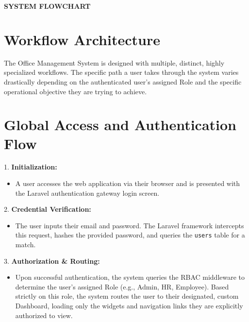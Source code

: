 ﻿\documentclass[12pt,a4paper]{report}
\begin{document}
\newpage
\vspace*{\fill}
\begin{center}
{\LARGE \textbf{SYSTEM FLOWCHART}}
\end{center}
\vspace*{\fill}

\newpage
\section*{Workflow Architecture}
The Office Management System is designed with multiple, distinct, highly specialized workflows. The specific path a user takes through the system varies drastically depending on the authenticated user's assigned Role and the specific operational objective they are trying to achieve.

\section*{Global Access and Authentication Flow}
1. \textbf{Initialization:}
    \begin{itemize}
        \item A user accesses the web application via their browser and is presented with the Laravel authentication gateway login screen.
    \end{itemize}
2. \textbf{Credential Verification:}
    \begin{itemize}
        \item The user inputs their email and password. The Laravel framework intercepts this request, hashes the provided password, and queries the \texttt{users} table for a match.
    \end{itemize}
3. \textbf{Authorization \& Routing:}
    \begin{itemize}
        \item Upon successful authentication, the system queries the RBAC middleware to determine the user's assigned Role (e.g., Admin, HR, Employee). Based strictly on this role, the system routes the user to their designated, custom Dashboard, loading only the widgets and navigation links they are explicitly authorized to view.
    \end{itemize}
\end{document}
